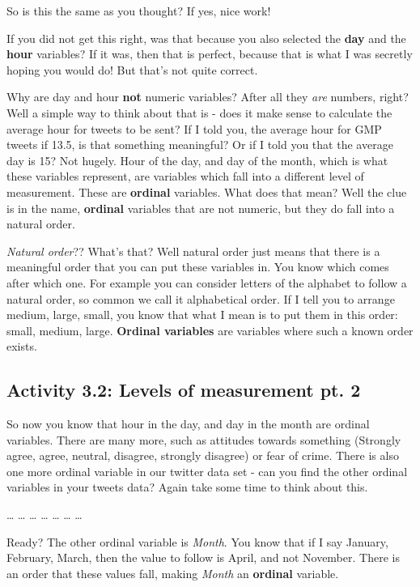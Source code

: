\documentclass[]{book}
\theoremstyle{definition}
\theoremstyle{definition}
\theoremstyle{definition}
\theoremstyle{remark}
\begin{document}
So is this the same as you thought? If yes, nice work!

If you did not get this right, was that because you also selected the
\textbf{day} and the \textbf{hour} variables? If it was, then that is
perfect, because that is what I was secretly hoping you would do! But
that's not quite correct.

Why are day and hour \textbf{not} numeric variables? After all they
\emph{are} numbers, right? Well a simple way to think about that is -
does it make sense to calculate the average hour for tweets to be sent?
If I told you, the average hour for GMP tweets if 13.5, is that
something meaningful? Or if I told you that the average day is 15? Not
hugely. Hour of the day, and day of the month, which is what these
variables represent, are variables which fall into a different level of
measurement. These are \textbf{ordinal} variables. What does that mean?
Well the clue is in the name, \textbf{ordinal} variables that are not
numeric, but they do fall into a natural order.

\emph{Natural order}?? What's that? Well natural order just means that
there is a meaningful order that you can put these variables in. You
know which comes after which one. For example you can consider letters
of the alphabet to follow a natural order, so common we call it
alphabetical order. If I tell you to arrange medium, large, small, you
know that what I mean is to put them in this order: small, medium,
large. \textbf{Ordinal variables} are variables where such a known order
exists.

\hypertarget{activity-3.2-levels-of-measurement-pt.-2}{%
\subsection{Activity 3.2: Levels of measurement pt.
2}\label{activity-3.2-levels-of-measurement-pt.-2}}

{ So now you know that hour in the day, and day in the month are ordinal
variables. There are many more, such as attitudes towards something
(Strongly agree, agree, neutral, disagree, strongly disagree) or fear of
crime. There is also one more ordinal variable in our twitter data set -
can you find the other ordinal variables in your tweets data? Again take
some time to think about this. }

\ldots{} \ldots{} \ldots{} \ldots{} \ldots{} \ldots{} \ldots{}

Ready? The other ordinal variable is \emph{Month}. You know that if I
say January, February, March, then the value to follow is April, and not
November. There is an order that these values fall, making \emph{Month}
an \textbf{ordinal} variable.
\end{document}
